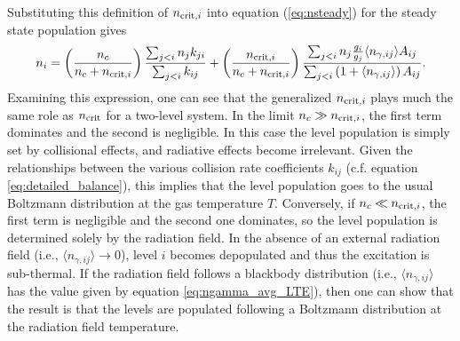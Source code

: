 Substituting this definition of $n_{{\rm crit},i}$ into equation (\ref{eq:nsteady}) for the steady state population gives
\begin{equation}
n_i = \left(\frac{n_c}{n_c+n_{{\rm crit},i}}\right) \frac{\sum_{j<i} n_j k_{ji}}{\sum_{j<i} k_{ij}}
+ \left(\frac{n_{{\rm crit},i}}{n_c+n_{{\rm crit},i}}\right) \frac{\sum_{j<i} n_j \frac{g_i}{g_j} \langle n_{\gamma,ij}\rangle A_{ij}}{\sum_{j<i} \left(1+\langle n_{\gamma,ij}\rangle\right) A_{ij}}.
\end{equation}
Examining this expression, one can see that the generalized $n_{{\rm crit},i}$ plays much the same role as $n_{\rm crit}$ for a two-level system. In the limit $n_c \gg n_{{\rm crit},i}$, the first term dominates and the second is negligible. In this case the level population is simply set by collisional effects, and radiative effects become irrelevant. Given the relationships between the various collision rate coefficients $k_{ij}$ (c.f. equation \ref{eq:detailed_balance}), this implies that the level population goes to the usual Boltzmann distribution at the gas temperature $T$. Conversely, if $n_c \ll n_{{\rm crit},i}$, the first term is negligible and the second one dominates, so the level population is determined solely by the radiation field. In the absence of an external radiation field (i.e., $\langle n_{\gamma,ij}\rangle \rightarrow 0$), level $i$ becomes depopulated and thus the excitation is sub-thermal. If the radiation field follows a blackbody distribution (i.e., $\langle n_{\gamma,ij}\rangle$ has the value given by equation \ref{eq:ngamma_avg_LTE}), then one can show that the result is that the levels are populated following a Boltzmann distribution at the radiation field temperature.
